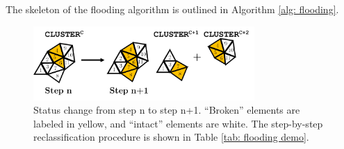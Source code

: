 The skeleton of the flooding algorithm is outlined in Algorithm \ref{alg: flooding}.

\begin{figure}[htb!]
  \centering
  \includegraphics[width=0.75\textwidth]{Appendices/figures/status_change.png}
  \caption[Status change from step n to step n+1.]{Status change from step n to step n+1. ``Broken'' elements are labeled in yellow, and ``intact'' elements are white. The step-by-step reclassification procedure is shown in Table \ref{tab: flooding demo}.}
  \label{fig: flooding demo}
\end{figure}

